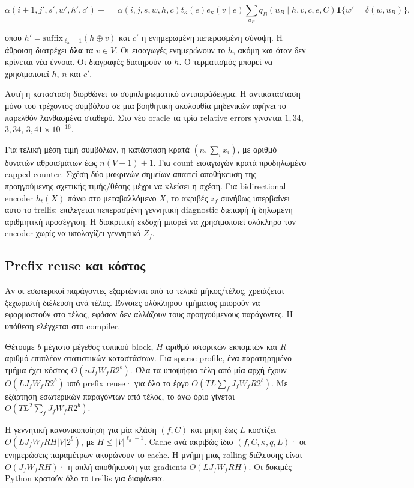 \documentclass[
  10pt,
  a4paper,
]{report}
\begin{document}
\[
\alpha(i+1,j',s',w',h',c')\mathrel{+}=
\alpha(i,j,s,w,h,c)t_\kappa(e)e_\kappa(v\mid e)
\sum_{u_B}q_B(u_B\mid h,v,c,e,C)\mathbf1\{w'=\delta(w,u_B)\},\tag{3}
\]

όπου \(h'=\mathrm{suffix}_{\ell_h-1}(h\oplus v)\) και \(c'\) η
ενημερωμένη πεπερασμένη σύνοψη. Η άθροιση διατρέχει \textbf{όλα} τα
\(v\in V\). Οι εισαγωγές ενημερώνουν το \(h\), ακόμη και όταν δεν
κρίνεται νέα έννοια. Οι διαγραφές διατηρούν το \(h\). Ο τερματισμός
μπορεί να χρησιμοποιεί \(h\), \(n\) και \(c'\).

Αυτή η κατάσταση διορθώνει το συμπληρωματικό αντιπαράδειγμα. Η
αντικατάσταση μόνο του τρέχοντος συμβόλου σε μια βοηθητική ακολουθία
μηδενικών αφήνει το παρελθόν λανθασμένα σταθερό. Στο νέο oracle τα τρία
relative errors γίνονται \(1,34\), \(3,34\), \(3,41\times10^{-16}\).

Για τελική μέση τιμή συμβόλων, η κατάσταση κρατά \((n,\sum_i x_i)\), με
αριθμό δυνατών αθροισμάτων έως \(n(V-1)+1\). Για count εισαγωγών κρατά
προδηλωμένο capped counter. Σχέση δύο μακρινών σημείων απαιτεί
αποθήκευση της προηγούμενης σχετικής τιμής/θέσης μέχρι να κλείσει η
σχέση. Για bidirectional encoder \(h_t(X)\) πάνω στο μεταβαλλόμενο
\(X\), το ακριβές \(z_f\) συνήθως υπερβαίνει αυτό το trellis: επιλέγεται
πεπερασμένη γεννητική diagnostic διεπαφή ή δηλωμένη αριθμητική
προσέγγιση. Η διακριτική εκδοχή μπορεί να χρησιμοποιεί ολόκληρο τον
encoder χωρίς να υπολογίζει γεννητικό \(Z_f\).

\subsection{Prefix reuse και
κόστος}\label{prefix-reuse-ux3baux3b1ux3b9-ux3baux3ccux3c3ux3c4ux3bfux3c2}

Αν οι εσωτερικοί παράγοντες εξαρτώνται από το τελικό μήκος/τέλος,
χρειάζεται ξεχωριστή διέλευση ανά τέλος. Έννοιες ολόκληρου τμήματος
μπορούν να εφαρμοστούν στο τέλος, εφόσον δεν αλλάζουν τους προηγούμενους
παράγοντες. Η υπόθεση ελέγχεται στο compiler.

Θέτουμε \(b\) μέγιστο μέγεθος τοπικού block, \(H\) αριθμό ιστορικών
εκπομπών και \(R\) αριθμό επιπλέον στατιστικών καταστάσεων. Για sparse
profile, ένα παρατηρημένο τμήμα έχει κόστος \(O(nJ_fW_fR2^b)\). Όλα τα
υποψήφια τέλη από μία αρχή έχουν \(O(LJ_fW_fR2^b)\) υπό prefix reuse·
για όλο το έργο \(O(TL\sum_fJ_fW_fR2^b)\). Με εξάρτηση εσωτερικών
παραγόντων από τέλος, το άνω όριο γίνεται \(O(TL^2\sum_fJ_fW_fR2^b)\).

Η γεννητική κανονικοποίηση για μία κλάση \((f,C)\) και μήκη έως \(L\)
κοστίζει \(O(LJ_fW_fRH|V|2^b)\), με \(H\le |V|^{\ell_h-1}\). Cache ανά
ακριβώς ίδιο \((f,C,\kappa,q,L)\)· οι ενημερώσεις παραμέτρων ακυρώνουν
το cache. Η μνήμη μιας rolling διέλευσης είναι \(O(J_fW_fRH)\)· η απλή
αποθήκευση για gradients \(O(LJ_fW_fRH)\). Οι δοκιμές Python κρατούν όλο
το trellis για διαφάνεια.
\end{document}
